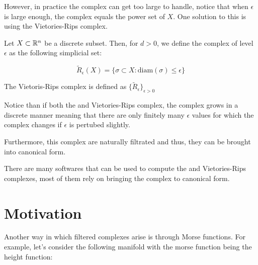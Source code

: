 However, in practice the {\Cech} complex can get too large to handle, notice that when $\epsilon$ is large enough,
the {\Cech} complex equals the power set of $X$. One solution to this is using the 
Vietories-Rips complex.



\begin{definition}
Let $X\subset \mathbb{R}^n$ be a discrete subset. Then, for $d>0$, we define the \Cech
complex of level $\epsilon$ as the following simplicial set:

$$
\tilde{R}_\epsilon(X)
=
\{
\sigma \subset X :
\text{diam}(\sigma)\leq \epsilon
\}
$$

\end{definition}

The Vietoris-Rips complex is defined as $\{\tilde{R}_\epsilon\}_{\epsilon>0}$

\begin{remark}
Notice than if both the {\Cech} and Vietories-Rips complex, the complex grows in a discrete manner meaning
that there are only finitely many $\epsilon$ values for which the complex changes if $\epsilon$ is pertubed slightly.

Furthermore, this complex are naturally filtrated and thus, they can be brought into canonical form.
\end{remark}

There are many softwares that can be used to compute the
{\Cech} and Vietories-Rips complexes, most of them rely on bringing the complex to canonical form.

\section{Motivation}

Another way in which filtered complexes arise is through Morse functions. For example, let's 
consider the following manifold with the morse function being the height function:





